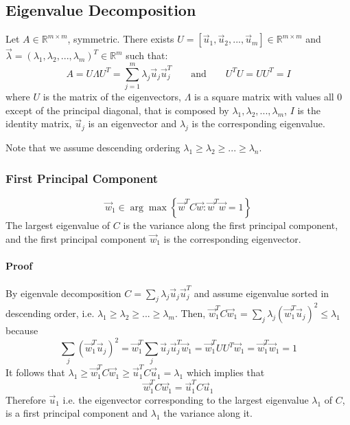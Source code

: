 \subsection{Eigenvalue Decomposition}
Let \(A \in \mathbb{R}^{m \times m}\), symmetric. There exists \(U = \left[ \vec{u}_1, \vec{u}_2, ..., \vec{u}_m \right] \in \mathbb{R}^{m \times m}\) and \(\vec{\lambda} = (\lambda_1, \lambda_2, ..., \lambda_m)^T \in \mathbb{R}^{m}\) such that:
\begin{equation}
    A = U \Lambda U^T = \sum_{j=1}^m \lambda_j \vec{u}_j \vec{u}_j^T \qquad \text{and} \qquad U^T U = UU^T = I
\end{equation}
where \(U\) is the matrix of the eigenvectors, \(\Lambda\) is a square matrix with values all 0 except of the principal diagonal, that is composed by \(\lambda_1, \lambda_2, ..., \lambda_m\), \(I\) is the identity matrix, \(\vec{u}_j\) is an eigenvector and \(\lambda_j\) is the corresponding eigenvalue. 

Note that we assume descending ordering \(\lambda_1 \geq \lambda_2 \geq ... \geq \lambda_n\).

\subsubsection{First Principal Component}
\begin{equation}
    \vec{w}_1 \in \arg \max \left\{ \vec{w}^T C \vec{w} : \vec{w}^T \vec{w} = 1 \right\}
\end{equation}
The largest eigenvalue of \(C\) is the variance along the first principal component, and the first principal component \(\vec{w}_1\) is the corresponding eigenvector.

\paragraph{Proof}
By eigenvale decomposition \(C = \sum_j \lambda_j \vec{u}_j \vec{u}_j^T\) and assume eigenvalue sorted in descending order, i.e. \(\lambda_1 \geq \lambda_2 \geq ... \geq \lambda_m\). Then, \(\vec{w}_1^T C \vec{w}_1 = \sum_j \lambda_j (\vec{w}_1^T \vec{u}_j)^2 \leq \lambda_1\) because
\begin{equation*}
    \sum_j (\vec{w}_1^T \vec{u}_j)^2 = \vec{w}_1^T \sum_j \vec{u}_j \vec{u}_j^T \vec{w}_1 = \vec{w}_1^T UU^T \vec{w}_1 = \vec{w}_1^T \vec{w}_1 = 1
\end{equation*}
It follows that \(\lambda_1 \geq \vec{w}_1^T C \vec{w}_1 \geq \vec{u}_1^T C \vec{u}_1 = \lambda_1\) which implies that 
\begin{equation*}
    \vec{w}_1^T C \vec{w}_1 = \vec{u}_1^T C \vec{u}_1
\end{equation*}
Therefore \(\vec{u}_1\) i.e. the eigenvector corresponding to the largest eigenvalue \(\lambda_1\) of \(C\), is a first principal component and \(\lambda_1\) the variance along it.

